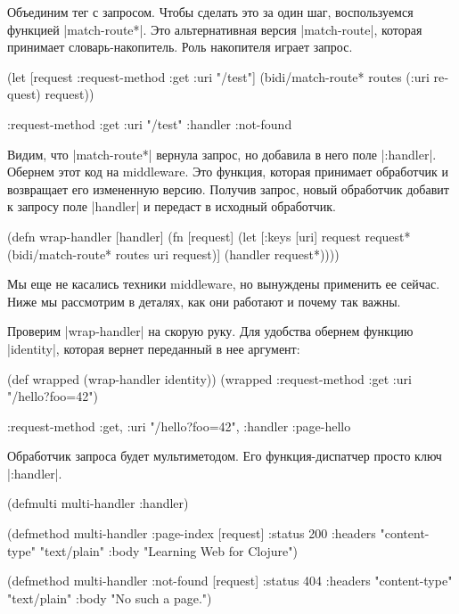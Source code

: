 Объединим тег с запросом. Чтобы сделать это за один шаг, воспользуемся функцией
\spverb|match-route*|. Это альтернативная версия \spverb|match-route|, которая
принимает словарь-накопитель. Роль накопителя играет запрос.

\begin{english}
  \begin{clojure}
(let [request {:request-method :get
               :uri "/test"}]
  (bidi/match-route* routes (:uri request) request))

{:request-method :get
 :uri "/test"
 :handler :not-found}
  \end{clojure}
\end{english}

Видим, что \spverb|match-route*| вернула запрос, но добавила в него поле
\spverb|:handler|. Обернем этот код на middleware. Это функция, которая
принимает обработчик и возвращает его измененную версию. Получив запрос, новый
обработчик добавит к запросу поле \spverb|handler| и передаст в исходный
обработчик.

\begin{english}
  \begin{clojure}
(defn wrap-handler [handler]
  (fn [request]
    (let [{:keys [uri]} request
          request* (bidi/match-route* routes uri request)]
      (handler request*))))
  \end{clojure}
\end{english}

Мы еще не касались техники middleware, но вынуждены применить ее сейчас. Ниже мы
рассмотрим в деталях, как они работают и почему так важны.

Проверим \spverb|wrap-handler| на скорую руку. Для удобства обернем функцию
\spverb|identity|, которая вернет переданный в нее аргумент:

\begin{english}
  \begin{clojure}
(def wrapped (wrap-handler identity))
(wrapped {:request-method :get
          :uri "/hello?foo=42"})

{:request-method :get,
 :uri "/hello?foo=42",
 :handler :page-hello}
  \end{clojure}
\end{english}

Обработчик запроса будет мультиметодом. Его функция-диспатчер просто ключ
\spverb|:handler|.

\begin{english}
  \begin{clojure}
(defmulti multi-handler :handler)

(defmethod multi-handler :page-index
  [request]
  {:status 200
   :headers {"content-type" "text/plain"}
   :body "Learning Web for Clojure"})

(defmethod multi-handler :not-found
  [request]
  {:status 404
   :headers {"content-type" "text/plain"}
   :body "No such a page."})
  \end{clojure}
\end{english}

